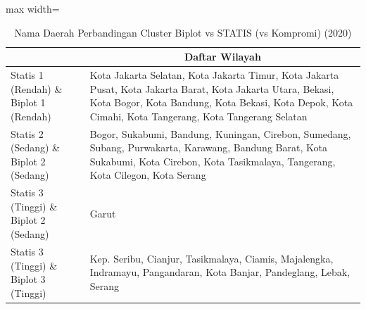 \begin{table}[H]
\centering
\caption{Nama Daerah Perbandingan Cluster Biplot vs STATIS (vs Kompromi) (2020)} \label{tab:app2biplot_statis_name_2020}
\begin{adjustbox}{max width=\textwidth}
\begin{tabular}{|>{\centering\arraybackslash}p{4cm}|p{10cm}|}
\hline
\multicolumn{1}{|c|}{\textbf{Kategori}} & \multicolumn{1}{c|}{\textbf{Daftar Wilayah}} \\
\hline
Statis 1 (Rendah) \& Biplot 1 (Rendah) & Kota Jakarta Selatan, Kota Jakarta Timur, Kota Jakarta Pusat, Kota Jakarta Barat, Kota Jakarta Utara, Bekasi, Kota Bogor, Kota Bandung, Kota Bekasi, Kota Depok, Kota Cimahi, Kota Tangerang, Kota Tangerang Selatan \\
\hline
Statis 2 (Sedang) \& Biplot 2 (Sedang) & Bogor, Sukabumi, Bandung, Kuningan, Cirebon, Sumedang, Subang, Purwakarta, Karawang, Bandung Barat, Kota Sukabumi, Kota Cirebon, Kota Tasikmalaya, Tangerang, Kota Cilegon, Kota Serang \\
\hline
Statis 3 (Tinggi) \& Biplot 2 (Sedang) & Garut \\
\hline
Statis 3 (Tinggi) \& Biplot 3 (Tinggi) & Kep. Seribu, Cianjur, Tasikmalaya, Ciamis, Majalengka, Indramayu, Pangandaran, Kota Banjar, Pandeglang, Lebak, Serang \\
\hline
\end{tabular}
\end{adjustbox}
\end{table}
